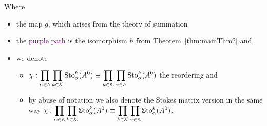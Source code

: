 Where
\begin{itemize}
  \item the map $g$, which arises from the theory of summation
  \item the \textcolor{purple}{purple path} is the isomorphism $h$ from
    Theorem~\ref{thm:mainThm2} and
  \item we denote
    \begin{itemize}
      \item $\chi:\displaystyle \prod_{\alpha\in\mathbb{A}}\prod_{k\in\mathcal{K}}\operatorname{Sto}_\alpha^k(A^0)
        \equiv\displaystyle \prod_{k\in\mathcal{K}}\prod_{\alpha\in\mathbb{A}}\operatorname{Sto}_\alpha^k(A^0)$
        the reordering and
      \item by abuse of notation we also denote the Stokes matrix version in
        the same way
        $\chi:\displaystyle \prod_{\alpha\in\mathbb{A}}\prod_{k\in\mathcal{K}}\operatorname{\mathbb{S}to}_\alpha^k(A^0)
        \equiv\displaystyle
        \prod_{k\in\mathcal{K}}\prod_{\alpha\in\mathbb{A}}\operatorname{\mathbb{S}to}_\alpha^k(A^0)$.
    \end{itemize}
\end{itemize}
